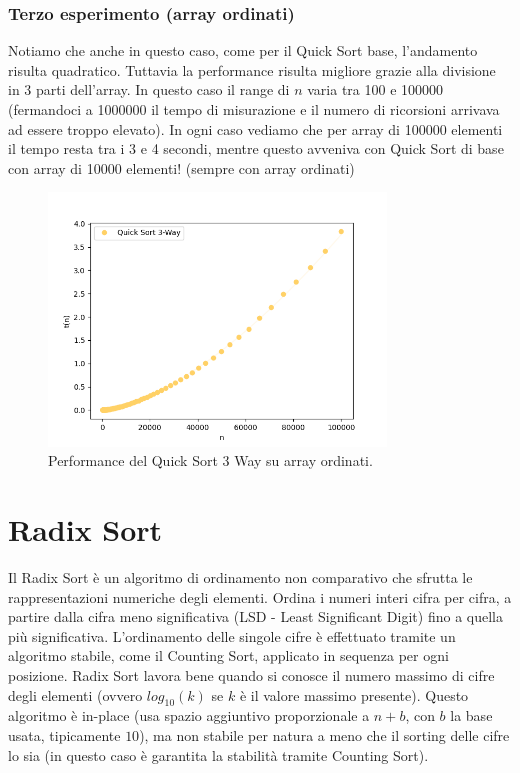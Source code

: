 \documentclass[a4paper, 12pt, oneside]{book}
\begin{document}
\subsection{Terzo esperimento (array ordinati)}

Notiamo che anche in questo caso, come per il Quick Sort base, l'andamento risulta quadratico.
Tuttavia la performance risulta migliore grazie alla divisione in 3 parti dell'array.
In questo caso il range di \(n\) varia tra 100 e 100000 (fermandoci a 1000000 il tempo di misurazione e il numero di ricorsioni arrivava ad essere troppo elevato). In ogni caso vediamo che per array di 100000 elementi il tempo resta tra i 3 e 4 secondi, mentre questo avveniva con Quick Sort di base con array di 10000 elementi! (sempre con array ordinati)

\begin{figure}[H]
    \centering
    \includegraphics[width=0.8\textwidth]{images/quicksort3wayCasoPeggiore.png}
    \caption{Performance del Quick Sort 3 Way su array ordinati.}
    \label{fig:quick_sort_3_way_m}
\end{figure}



\chapter{Radix Sort}\label{chap:Radix Sort} %

Il Radix Sort è un algoritmo di ordinamento non comparativo che sfrutta le rappresentazioni numeriche degli elementi. Ordina i numeri interi cifra per cifra, a partire dalla cifra meno significativa (LSD - Least Significant Digit) fino a quella più significativa. L'ordinamento delle singole cifre è effettuato tramite un algoritmo stabile, come il Counting Sort, applicato in sequenza per ogni posizione.
Radix Sort lavora bene quando si conosce il numero massimo di cifre degli elementi (ovvero \(log_{10}(k)\) se \(k\) è il valore massimo presente).
Questo algoritmo è in-place (usa spazio aggiuntivo proporzionale a \(n + b\), con \(b\) la base usata, tipicamente \(10\)), ma non stabile per natura a meno che il sorting delle cifre lo sia (in questo caso è garantita la stabilità tramite Counting Sort).
\end{document}

